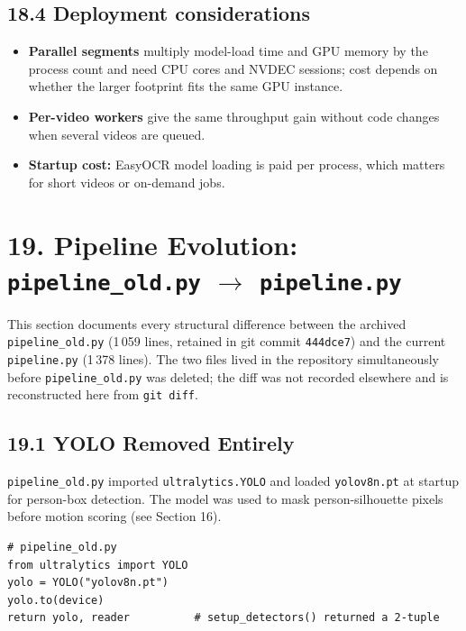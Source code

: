 \documentclass[11pt]{article}
\begin{document}
\subsection*{18.4 Deployment considerations}
\begin{itemize}[leftmargin=1.2em]
    \item \textbf{Parallel segments} multiply model-load time and GPU memory by the process count and need CPU cores and NVDEC sessions; cost depends on whether the larger footprint fits the same GPU instance.
    \item \textbf{Per-video workers} give the same throughput gain without code changes when several videos are queued.
    \item \textbf{Startup cost:} EasyOCR model loading is paid per process, which matters for short videos or on-demand jobs.
\end{itemize}

\bigskip

\section*{19. Pipeline Evolution: \texttt{pipeline\_old.py} $\rightarrow$ \texttt{pipeline.py}}

\noindent This section documents every structural difference between the archived
\texttt{pipeline\_old.py} (1\,059 lines, retained in git commit \texttt{444dce7}) and
the current \texttt{pipeline.py} (1\,378 lines).  The two files lived in the
repository simultaneously before \texttt{pipeline\_old.py} was deleted; the diff
was not recorded elsewhere and is reconstructed here from \texttt{git diff}.

\subsection*{19.1 YOLO Removed Entirely}

\texttt{pipeline\_old.py} imported \texttt{ultralytics.YOLO} and loaded
\texttt{yolov8n.pt} at startup for person-box detection.  The model was used
to mask person-silhouette pixels before motion scoring (see Section 16).

\begin{verbatim}
# pipeline_old.py
from ultralytics import YOLO
yolo = YOLO("yolov8n.pt")
yolo.to(device)
return yolo, reader          # setup_detectors() returned a 2-tuple
\end{verbatim}
\end{document}

